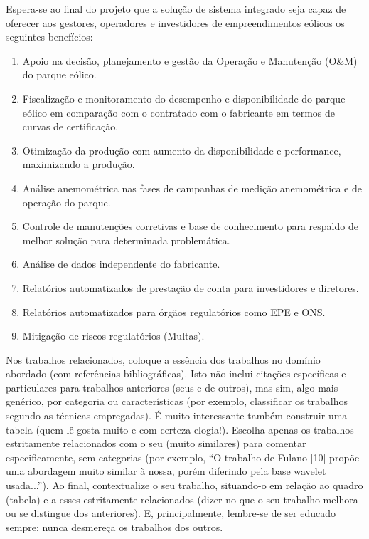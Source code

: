 Espera-se ao final do projeto que a solução de sistema integrado seja capaz de oferecer aos gestores, operadores e investidores de empreendimentos eólicos os seguintes benefícios:

\begin{enumerate}
\item Apoio na decisão, planejamento e gestão da Operação e Manutenção (O\&M) do parque eólico.
\item Fiscalização e monitoramento do desempenho e disponibilidade do parque eólico em comparação com o contratado com o fabricante em termos de curvas de certificação.
\item Otimização da produção com aumento da disponibilidade e performance, maximizando a produção.
\item Análise anemométrica nas fases de campanhas de medição anemométrica e de operação do parque.
\item Controle de manutenções corretivas e base de conhecimento para respaldo de melhor solução para determinada problemática.
\item Análise de dados independente do fabricante.
\item Relatórios automatizados de prestação de conta para investidores e diretores.
\item Relatórios automatizados para órgãos regulatórios como EPE e ONS.
\item Mitigação de riscos regulatórios (Multas).
\end{enumerate}




Nos trabalhos relacionados, coloque a essência dos trabalhos no domínio abordado (com referências bibliográficas). Isto não inclui citações específicas e particulares para trabalhos anteriores (seus e de outros), mas sim, algo mais genérico, por categoria ou características (por exemplo, classificar os trabalhos segundo as técnicas empregadas). É muito interessante também construir uma tabela (quem lê gosta muito e com certeza elogia!). Escolha apenas os trabalhos estritamente relacionados com o seu (muito similares) para comentar especificamente, sem categorias (por exemplo, ``O trabalho de Fulano [10] propõe uma abordagem muito similar à nossa, porém diferindo pela base wavelet usada...''). Ao final, contextualize o seu trabalho, situando-o em relação ao quadro (tabela) e a esses estritamente relacionados (dizer no que o seu trabalho melhora ou se distingue dos anteriores). E, principalmente, lembre-se de ser educado sempre: nunca desmereça os trabalhos dos outros.


